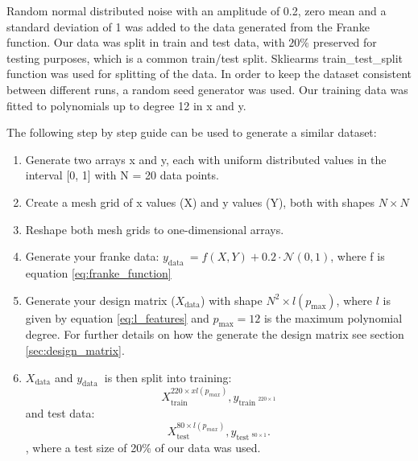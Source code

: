 Random normal distributed noise with an amplitude of 0.2, zero mean and a
standard deviation of 1 was added to the data generated from the Franke
function. Our data was split in train and test data, with $20\%$ preserved for
testing purposes, which is a common train/test split. Skliearms train\_test\_split function was used for splitting
of the data. In order to keep the dataset consistent between different runs, a
random seed generator was used. Our training data was fitted to polynomials up
to degree 12 in x and y. 

The following step by step guide can be used to generate a similar dataset: 



\begin{mdframed}[backgroundcolor=black!10]
\begin{enumerate}[noitemsep]
\item Generate two arrays x and y, each with uniform distributed values in the
interval [0, 1] with N = 20 data points. 
\item Create a mesh grid of x values (X) and y values (Y), both with shapes $N
\times N$ 
\item Reshape both mesh grids to one-dimensional arrays.  
\item Generate your franke data: $y_{\text{data }} = f(X, Y) + 0.2 \cdot  
\mathcal{N}(0,1)$, where f is equation \ref{eq:franke_function}  
\item Generate your design matrix ($X_{\text{data}} $) with shape $N^2 \times l(p_{\text{max}} )$,
where $l$ is given by equation \ref{eq:l_features} and $p_{\text{max}} = 12 $
is the maximum polynomial degree. For further details on how the generate the
design matrix see section \ref{sec:design_matrix}.  
\item $X_{\text{data}}$ and $y_{\text{data }} $ is then split into training: 
\begin{equation*}
    X_{\text{train }}^{220 \times x l(p_{max} )}, y_{\text{train }^{220\times 1}} 
\end{equation*}
and test data: 
\begin{equation*}
    X_{\text{test }}^{80\times l(p_{max} )},  y_{\text{test }^{80\times1}}.
\end{equation*},
where a test size of 20\% of our data was used. 
\end{enumerate}

\end{mdframed}


